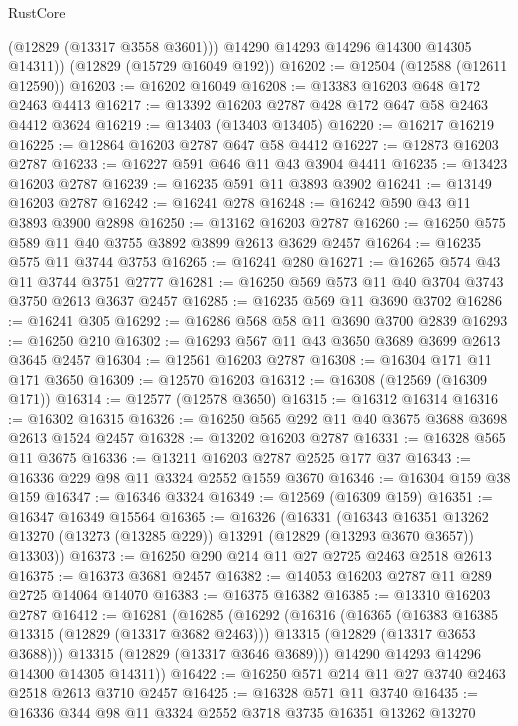 \begin{lexlean}{RustCore}
\begin{coremodule}
          (@12829 (@13317 @3558 @3601)))
        @14290
        @14293
        @14296
        @14300
        @14305
        @14311))
    (@12829 (@15729 @16049 @192))
@16202 := @12504 (@12588 (@12611 @12590))
@16203 := @16202 @16049
@16208 := @13383 @16203 @648 @172 @2463 @4413
@16217 := @13392 @16203 @2787 @428 @172 @647 @58 @2463 @4412 @3624
@16219 := @13403 (@13403 @13405)
@16220 := @16217 @16219
@16225 := @12864 @16203 @2787 @647 @58 @4412
@16227 := @12873 @16203 @2787
@16233 := @16227 @591 @646 @11 @43 @3904 @4411
@16235 := @13423 @16203 @2787
@16239 := @16235 @591 @11 @3893 @3902
@16241 := @13149 @16203 @2787
@16242 := @16241 @278
@16248 := @16242 @590 @43 @11 @3893 @3900 @2898
@16250 := @13162 @16203 @2787
@16260 := @16250 @575 @589 @11 @40 @3755 @3892 @3899 @2613 @3629 @2457
@16264 := @16235 @575 @11 @3744 @3753
@16265 := @16241 @280
@16271 := @16265 @574 @43 @11 @3744 @3751 @2777
@16281 := @16250 @569 @573 @11 @40 @3704 @3743 @3750 @2613 @3637 @2457
@16285 := @16235 @569 @11 @3690 @3702
@16286 := @16241 @305
@16292 := @16286 @568 @58 @11 @3690 @3700 @2839
@16293 := @16250 @210
@16302 := @16293 @567 @11 @43 @3650 @3689 @3699 @2613 @3645 @2457
@16304 := @12561 @16203 @2787
@16308 := @16304 @171 @11 @171 @3650
@16309 := @12570 @16203
@16312 := @16308 (@12569 (@16309 @171))
@16314 := @12577 (@12578 @3650)
@16315 := @16312 @16314
@16316 := @16302 @16315
@16326 := @16250 @565 @292 @11 @40 @3675 @3688 @3698 @2613 @1524 @2457
@16328 := @13202 @16203 @2787
@16331 := @16328 @565 @11 @3675
@16336 := @13211 @16203 @2787 @2525 @177 @37
@16343 := @16336 @229 @98 @11 @3324 @2552 @1559 @3670
@16346 := @16304 @159 @38 @159
@16347 := @16346 @3324
@16349 := @12569 (@16309 @159)
@16351 := @16347 @16349 @15564
@16365 := @16326
    (@16331
      (@16343
        @16351
        @13262
        @13270
        (@13273 (@13285 @229))
        @13291
        (@12829 (@13293 @3670 @3657))
        @13303))
@16373 := @16250 @290 @214 @11 @27 @2725 @2463 @2518 @2613
@16375 := @16373 @3681 @2457
@16382 := @14053 @16203 @2787 @11 @289 @2725 @14064 @14070
@16383 := @16375 @16382
@16385 := @13310 @16203 @2787
@16412 := @16281
    (@16285
      (@16292
        (@16316
          (@16365
            (@16383 @16385 @13315 (@12829 (@13317 @3682 @2463)))
            @13315
            (@12829 (@13317 @3653 @3688)))
          @13315
          (@12829 (@13317 @3646 @3689)))
        @14290
        @14293
        @14296
        @14300
        @14305
        @14311))
@16422 := @16250 @571 @214 @11 @27 @3740 @2463 @2518 @2613 @3710 @2457
@16425 := @16328 @571 @11 @3740
@16435 := @16336 @344 @98 @11 @3324 @2552 @3718 @3735 @16351 @13262 @13270

\end{coremodule}
\end{lexlean}
